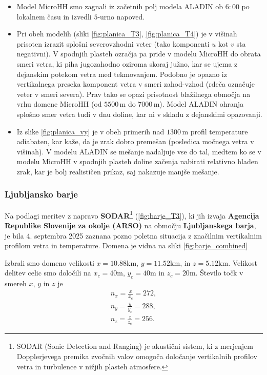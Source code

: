 \documentclass[mat2, tisk]{fmfdelo}
\begin{document}
\begin{itemize}
  \item Model MicroHH smo zagnali iz začetnih polj modela ALADIN ob \(6{:}00\) po lokalnem času in izvedli \(5\)-urno napoved.
   \item Pri obeh modelih (sliki \ref{fig:planica_T3}, \ref{fig:planica_T4}) je v višinah prisoten izrazit 
   splošni severovzhodni veter (tako komponenti \(u\) 
   kot \(v\) sta negativni). V spodnjih plasteh ozračja 
   pa pride v modelu {MicroHH} do obrata smeri 
   vetra, ki piha jugozahodno oziroma skoraj južno, kar 
   se ujema z dejanskim potekom vetra med tekmovanjem. 
   Podobno je opazno iz vertikalnega preseka komponent 
   vetra v smeri zahod-vzhod (rdeča označuje veter v 
   smeri severa). Prav tako se opazi prisotnost 
   blažilnega območja na vrhu domene {MicroHH} 
   (od \(5500\,\mathrm{m}\) do \(7000\,\mathrm{m}\)). 
   Model {ALADIN} ohranja splošno smer vetra tudi 
    v dnu doline, kar ni v skladu z dejanskimi opazovanji.
  \item Iz slike \ref{fig:planica_vy} je v obeh primerih nad \(1300\,\mathrm{m}\) 
  profil temperature adiabaten, kar kaže, da je zrak 
  dobro premešan (posledica močnega vetra v višinah). 
  V modelu {ALADIN} se mešanje nadaljuje vse do 
  tal, medtem ko se v modelu {MicroHH} v spodnjih
  plasteh doline začenja nabirati relativno hladen zrak,
  kar je bolj realističen prikaz, saj nakazuje manjše 
  mešanje.

\end{itemize}

\newpage
\subsubsection{Ljubljansko barje}

Na podlagi meritev z napravo \textbf{SODAR}\footnote{SODAR (Sonic Detection and Ranging) je akustični sistem, ki z merjenjem Dopplerjevega premika zvočnih valov omogoča določanje vertikalnih profilov vetra in turbulence v nižjih plasteh atmosfere.} 
(\ref{fig:barje_T3}), ki jih izvaja \textbf{Agencija Republike Slovenije za okolje (ARSO)} na območju \textbf{Ljubljanskega barja}, 
je bila 4. septembra 2025 zaznana pozno poletna situacija z značilnim vertikalnim profilom vetra in temperature. Domena je vidna na sliki \ref{fig:barje_combined}

Izbrali smo domeno velikosti $x= 10.88$km, 
$y = 11.52$km, in $z = 5.12$km. Velikost delitev celic smo določili na
$x_c=40$m, $y_c=40$m in $z_c=20$m. Število točk v smereh $x$, $y$ in $z$ je 
\begin{align*}
n_x = \frac{x}{x_c} = 272 , \\
n_y = \frac{y}{y_c} = 288, \\
n_z = \frac{z}{z_c} = 256.
\end{align*}
\end{document}

